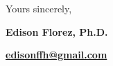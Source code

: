 

Yours sincerely,

\vspace*{6mm}

\textbf{Edison Florez, Ph.D.}

\href{mailto:edisonffh@gmail.com}{\bf edisonffh@gmail.com}




